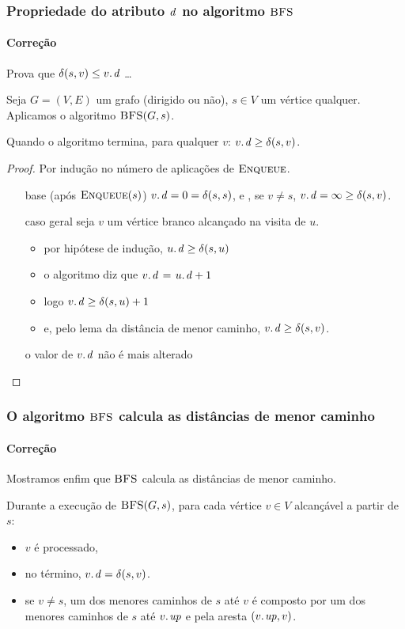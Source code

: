 \documentclass{beamer}
\begin{document}
\begin{frame}
\frametitle{Propriedade do atributo $\id{d}$ no algoritmo $\textnormal{\scshape BFS}$}
\framesubtitle{Correção}

Prova que $\delta(s, v) \le \attrib{v}{d}$ \ldots
\begin{lemma}
Seja $G = (V, E)$ um grafo (dirigido ou não), $s \in V$ um vértice
qualquer. Aplicamos o algoritmo $\textnormal{\scshape BFS}(G, s)$. 

Quando o algoritmo termina, para qualquer $v$: $\attrib{v}{d} \ge \delta(s, v)$.
\end{lemma}
\pause
\begin{proof}
  Por indução no número de aplicações de $\textnormal{\scshape Enqueue}$.

  \begin{enumerate}
  \item[base] (após $\textnormal{\scshape Enqueue}(s)$) $\attrib{v}{d} = 0 = \delta(s, s)$, e ,
    se $v \neq s$, $\attrib{v}{d} = \infty \ge \delta(s, v)$.
  \item[caso geral] seja $v$ um vértice branco alcançado na visita de $u$.
    \begin{itemize}
      \item por hipótese de indução, $\attrib{u}{d} \ge \delta(s, u)$
      \item o algoritmo diz que $\attrib{v}{d} \gets \attrib{u}{d} + 1$
      \item logo $\attrib{v}{d} \ge \delta(s, u)+1$
      \item e, pelo lema da distância de menor caminho, $\attrib{v}{d} \ge \delta(s, v)$.
    \end{itemize}
  \item[] o valor de $\attrib{v}{d}$ não é mais alterado
  \end{enumerate}
\end{proof}

\end{frame}

\begin{frame}
\frametitle{O algoritmo $\textnormal{\scshape BFS}$ calcula as distâncias de menor caminho}
\framesubtitle{Correção}

Mostramos enfim que $\textnormal{\scshape BFS}$ calcula as distâncias de menor caminho.

\begin{theorem}
Durante a execução de $\textnormal{\scshape BFS}(G, s)$, para cada vértice $v \in V$ alcançável a partir de $s$:
\begin{itemize}
\item $v$ é processado,
\item no término, $\attrib{v}{d} = \delta(s, v)$.
\item se $v \neq s$, um dos menores caminhos de $s$ até $v$ é composto por um dos menores caminhos de $s$ até
$\attrib{v}{up}$ e pela aresta $(\attrib{v}{up}, v)$.
\end{itemize}
\end{theorem}
\end{frame}
\end{document}
